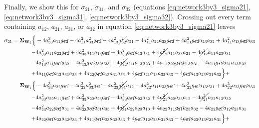 \documentclass{article}
\begin{document}
Finally, we show this for $\sigma_{21}$, $\sigma_{31}$, and $\sigma_{32}$ (equations
\ref{eq:network3by3_sigma21}, \ref{eq:network3by3_sigma31}, \ref{eq:network3by3_sigma32}).
Crossing out every term containing $a_{12}$, $a_{21}$, $a_{31}$, or $a_{32}$ in equation \ref{eq:network3by3_sigma21} leaves
\begin{equation}
\begin{aligned}
\sigma_{21} =  \mathbf{\Sigma}_{\textbf{W}_{2}} \Bigl\{ & -4 a_{33}^{3} a_{11} \cancel{a_{12}} - 4 a_{11}^{2} a_{33}^{2} \cancel{a_{12}} - 4 a_{13}^{2} \cancel{a_{32}^{2}} a_{21} - 4 a_{11}^{2} a_{22} a_{33} \cancel{a_{12}} + 4 a_{11}^{2} \cancel{a_{12}} a_{23} a_{32} + 4 a_{11}^{2} a_{13} \cancel{a_{32}} a_{33} \\
-& 4 a_{33}^{2} a_{11} a_{22} \cancel{a_{12}} + 4 a_{33}^{2} a_{11} a_{13} \cancel{a_{32}} + 4 a_{33}^{2} \cancel{a_{12}} a_{13} a_{31} + 4 \cancel{a_{12}^{2}} a_{11} a_{33} a_{21} - 4\cancel{a_{12}^{2}} a_{11} a_{23} a_{31} \\
-& 4 a_{13}^{2} a_{11} \cancel{a_{31}} a_{32} - 4 a_{13}^{2} \cancel{a_{31}} a_{32} a_{33} + 4 \cancel{a_{32}^{2}} a_{11} a_{13} a_{23} + 4 a_{11} a_{22} \cancel{a_{12}} a_{13} a_{31} - 4 a_{11} \cancel{a_{12}}a_{21} a_{13} a_{32} \\
+& 4 a_{11} \cancel{a_{12}} a_{13} a_{31} a_{33} + 4 a_{22} \cancel{a_{12}} a_{13} a_{31} a_{33} + 4 \cancel{a_{12}} a_{21} a_{13} a_{32} a_{33} - 4 \cancel{a_{12}} a_{13} a_{23} a_{31} a_{32}\Bigr\} + \\
\mathbf{\Sigma}_{\textbf{W}_{1}} \Bigl\{& -4 a_{33}^{3} a_{22} \cancel{a_{21}} - 4 a_{22}^{2} a_{33}^{2} \cancel{a_{21}} - 4 a_{23}^{2} \cancel{a_{31}^{2}} a_{12} - 4 a_{22}^{2} a_{11} a_{33} \cancel{a_{21}} + 4 a_{22}^{2} \cancel{a_{21}} a_{13} a_{31} + 4 a_{22}^{2} a_{23} \cancel{a_{31}} a_{33} \\
-& 4 a_{33}^{2} a_{22} a_{11} \cancel{a_{21}} + 4 a_{33}^{2} a_{22} a_{23} \cancel{a_{31}} + 4 a_{33}^{2} \cancel{a_{21}} a_{23} a_{32} + 4 \cancel{a_{21}^{2}} a_{22} a_{33} a_{12} - 4 \cancel{a_{21}^{2}} a_{22} a_{13} a_{32} \\
-& 4 a_{23}^{2} a_{22} \cancel{a_{32}} a_{31} - 4 a_{23}^{2} \cancel{a_{32}} a_{31} a_{33} + 4 \cancel{a_{31}^{2}} a_{22} a_{23} a_{13} + 4 a_{22} a_{11} \cancel{a_{21}} a_{23} a_{32} - 4 a_{22} \cancel{a_{21}} a_{12} a_{23} a_{31} \\
+& 4 a_{22} \cancel{a_{21}} a_{23} a_{32} a_{33} + 4 a_{11} \cancel{a_{21}} a_{23} a_{32} a_{33} + 4 \cancel{a_{21}} a_{12} a_{23} a_{31} a_{33} - 4 \cancel{a_{21}} a_{23} a_{13} a_{32} a_{31}\Bigr\} + \\

\end{aligned}
\end{equation}
\end{document}
